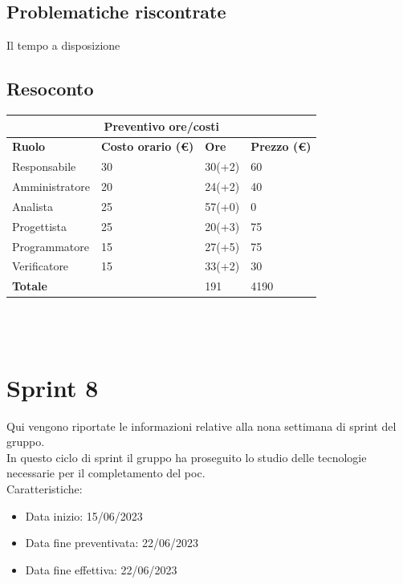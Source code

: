\documentclass[12pt]{article}
\begin{document}
\subsection{Problematiche riscontrate}
Il tempo a disposizione

\subsection{Resoconto}
\begin{center}
    \begin{tabularx}{\textwidth}{|X|X|X|X|}
        \hline
        \multicolumn{4}{|c|}{\textbf{Preventivo ore/costi}}\\
        \hline
        \hline
        \textbf{Ruolo} & \textbf{Costo orario (\euro)} & \textbf{Ore} & \textbf{Prezzo (\euro)}\\
        \hline
        Responsabile    & 30 & 30(+2)  & 60\\
        \hline
        Amministratore  & 20 & 24(+2)  & 40\\
        \hline
        Analista        & 25 & 57(+0)  & 0\\
        \hline
        Progettista     & 25 & 20(+3)  & 75\\
        \hline
        Programmatore   & 15 & 27(+5)  & 75\\
        \hline
        Verificatore    & 15 & 33(+2)  & 30\\
        \hline
        \hline
        \textbf{Totale} &    & 191 &  4190 \\
        \hline
    \end{tabularx}\\[8pt]
    \mbox{}\\
\end{center}

\section{Sprint 8}
Qui vengono riportate le informazioni relative alla nona settimana di sprint del gruppo. \\
In questo ciclo di sprint il gruppo ha proseguito lo studio delle tecnologie necessarie per il completamento del poc. \\


Caratteristiche:

\begin{itemize}
    \item Data inizio: 15/06/2023
    \item Data fine preventivata: 22/06/2023
    \item Data fine effettiva: 22/06/2023
\end{itemize}
\end{document}
